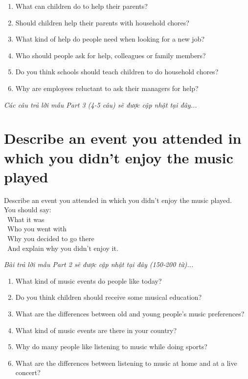 \begin{ieltsprompt}
\begin{enumerate}[itemsep=4pt]
    \item What can children do to help their parents?
    \item Should children help their parents with household chores?
    \item What kind of help do people need when looking for a new job?
    \item Who should people ask for help, colleagues or family members?
    \item Do you think schools should teach children to do household chores?
    \item Why are employees reluctant to ask their managers for help?
\end{enumerate}
\end{ieltsprompt}

\vspace{1em}
\textit{Các câu trả lời mẫu Part 3 (4-5 câu) sẽ được cập nhật tại đây...}
\vspace{2em}

\section{Describe an event you attended in which you didn't enjoy the music played}
\begin{ieltsprompt}
Describe an event you attended in which you didn't enjoy the music played. \\
You should say: \\
\textbullet\ What it was \\
\textbullet\ Who you went with \\
\textbullet\ Why you decided to go there \\
\textbullet\ And explain why you didn't enjoy it. \\
\end{ieltsprompt}

\vspace{1em}
\textit{Bài trả lời mẫu Part 2 sẽ được cập nhật tại đây (150-200 từ)...}
\vspace{2em}

\begin{ieltsprompt}
\begin{enumerate}[itemsep=4pt]
    \item What kind of music events do people like today?
    \item Do you think children should receive some musical education?
    \item What are the differences between old and young people's music preferences?
    \item What kind of music events are there in your country?
    \item Why do many people like listening to music while doing sports?
    \item What are the differences between listening to music at home and at a live concert?
\end{enumerate}
\end{ieltsprompt}

